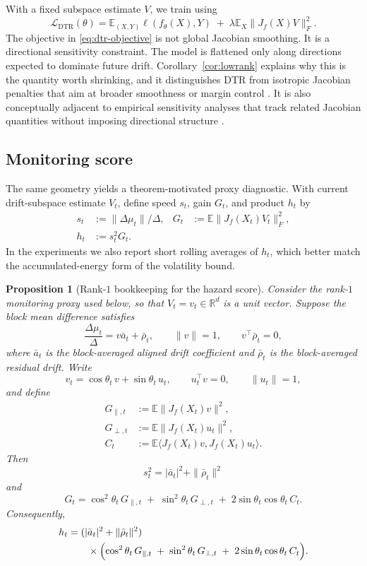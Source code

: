 \documentclass[conference]{IEEEtran}
\newtheorem{proposition}{Proposition}
\newcommand{\E}{\mathbb{E}}
\newcommand{\R}{\mathbb{R}}
\begin{document}
With a fixed subspace estimate $V$, we train using
\begin{equation}
\label{eq:dtr-objective}
\mathcal L_{\mathrm{DTR}}(\theta)
=
\E_{(X,Y)}\ell(f_\theta(X),Y)
\;+\;
\lambda\E_X\|J_f(X)V\|_F^2.
\end{equation}
The objective in \eqref{eq:dtr-objective} is not global Jacobian smoothing. It is a directional sensitivity constraint. The model is flattened only along directions expected to dominate future drift. Corollary~\ref{cor:lowrank} explains why this is the quantity worth shrinking, and it distinguishes DTR from isotropic Jacobian penalties that aim at broader smoothness or margin control \cite{sokolic-jacobian,kim-jacobian}. It is also conceptually adjacent to empirical sensitivity analyses that track related Jacobian quantities without imposing directional structure \cite{novak-sensitivity}.

\subsection{Monitoring score}
The same geometry yields a theorem-motivated proxy diagnostic. With current drift-subspace estimate $V_t$, define speed $s_t$, gain $G_t$, and product $h_t$ by
\begin{equation}
\label{eq:hazard-score}
\begin{aligned}
s_t&:=\|\Delta\mu_t\|/\Delta,
&
G_t&:=\E\|J_f(X_t)V_t\|_F^2, \\
h_t&:=s_t^2G_t.
\end{aligned}
\end{equation}
In the experiments we also report short rolling averages of $h_t$, which better match the accumulated-energy form of the volatility bound.

\begin{proposition}[Rank-$1$ bookkeeping for the hazard score]
\label{prop:hazard}
Consider the rank-$1$ monitoring proxy used below, so that $V_t=v_t\in\R^d$ is a unit vector. Suppose the block mean difference satisfies
\[
\frac{\Delta\mu_t}{\Delta}=v\bar a_t+\bar\rho_t,
\qquad
\|v\|=1,
\qquad
v^\top \bar\rho_t=0,
\]
where $\bar a_t$ is the block-averaged aligned drift coefficient and $\bar\rho_t$ is the block-averaged residual drift. Write
\[
v_t=\cos\theta_t\,v+\sin\theta_t\,u_t,
\qquad
u_t^\top v=0,
\qquad
\|u_t\|=1,
\]
and define
\[
\begin{aligned}
G_{\parallel,t}&:=\E\|J_f(X_t)v\|^2, \\
G_{\perp,t}&:=\E\|J_f(X_t)u_t\|^2, \\
C_t&:=\E\langle J_f(X_t)v,J_f(X_t)u_t\rangle.
\end{aligned}
\]
Then
\[
s_t^2=|\bar a_t|^2+\|\bar\rho_t\|^2
\]
and
\[
G_t=\cos^2\theta_t\,G_{\parallel,t}
\;+\;
\sin^2\theta_t\,G_{\perp,t}
\;+\;
2\sin\theta_t\cos\theta_t\,C_t.
\]
Consequently,
\[
\begin{aligned}
h_t&=(|\bar a_t|^2+\|\bar\rho_t\|^2) \\
&\qquad\times
\Bigl(
\cos^2\theta_t\,G_{\parallel,t}
\;+\;
\sin^2\theta_t\,G_{\perp,t}
\;+\;
2\sin\theta_t\cos\theta_t\,C_t
\Bigr).
\end{aligned}
\]
\end{proposition}
\end{document}
